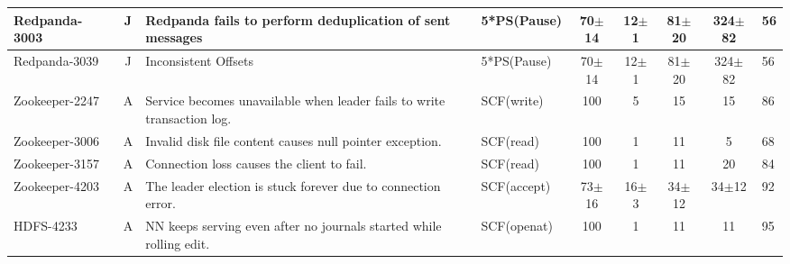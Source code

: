 \begin{table*}[t!]
\begin{tabular}{l|c|l|l|c|c|c|c|l}
		Redpanda-3003~\cite{redpanda3003}                                                                                           & J            & Redpanda fails to perform deduplication of sent messages                & 5*PS(Pause)                                                             & 70$\pm$14       & 12$\pm$1       & 81$\pm$20    & 324$\pm$82        & 56            \\ \hline
		Redpanda-3039~\cite{redpanda3039}                                                                                           & J            & Inconsistent Offsets                                                    & 5*PS(Pause)                                                             & 70$\pm$14       & 12$\pm$1       & 81$\pm$20    & 324$\pm$82        & 56            \\ \hline
		Zookeeper-2247~\cite{zookeeper2247}                                                                                         & A            & Service becomes unavailable when leader fails to write transaction log. & SCF(write)                                                              & 100             & 5              & 15           & 15                & 86            \\ \hline
		Zookeeper-3006~\cite{zookeeper3006}                                                                                         & A            & Invalid disk file content causes null pointer exception.                & SCF(read)                                                               & 100             & 1              & 11           & 5                 & 68            \\ \hline
		Zookeeper-3157~\cite{zookeeper3157}                                                                                         & A            & Connection loss causes the client to fail.                              & SCF(read)                                                               & 100             & 1              & 11           & 20                & 84            \\\hline
		Zookeeper-4203~\cite{zookeeper4203}                                                                                         & A            & The leader election is stuck forever due to connection error.           & SCF(accept)                                                             & 73$\pm$16       & 16$\pm$3       & 34$\pm$12    & 34$\pm$12         & 92            \\ \hline
		HDFS-4233~\cite{hdfs4233}                                                                                                   & A            & NN keeps serving even after no journals started while rolling edit.     & SCF(openat)                                                             & 100             & 1              & 11           & 11                & 95            \\ \hline

\end{tabular}
\end{table*}
